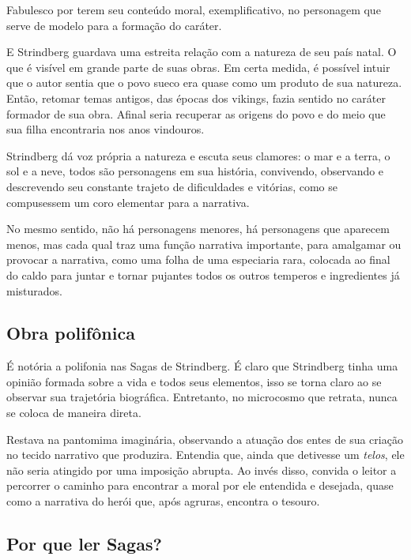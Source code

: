\documentclass[12pt]{extarticle}
\begin{document}
Fabulesco por terem seu conteúdo moral, exemplificativo, no personagem
que serve de modelo para a formação do caráter.

E Strindberg guardava uma estreita relação com a natureza de seu país
natal. O que é visível em grande parte de suas obras. Em certa medida, é
possível intuir que o autor sentia que o povo sueco era quase como um
produto de sua natureza. Então, retomar temas antigos, das épocas dos
vikings, fazia sentido no caráter formador de sua obra. Afinal seria
recuperar as origens do povo e do meio que sua filha encontraria nos
anos vindouros.




Strindberg dá voz própria a natureza e escuta seus clamores: o mar e a
terra, o sol e a neve, todos são personagens em sua história,
convivendo, observando e descrevendo seu constante trajeto de
dificuldades e vitórias, como se compusessem um coro elementar para a
narrativa.

No mesmo sentido, não há personagens menores, há personagens que
aparecem menos, mas cada qual traz uma função narrativa importante, para
amalgamar ou provocar a narrativa, como uma folha de uma especiaria
rara, colocada ao final do caldo para juntar e tornar pujantes todos os
outros temperos e ingredientes já misturados.

\subsection{Obra polifônica}

É notória a polifonia nas Sagas de Strindberg. É claro que Strindberg
tinha uma opinião formada sobre a vida e todos seus elementos, isso se
torna claro ao se observar sua trajetória biográfica. Entretanto, no
microcosmo que retrata, nunca se coloca de maneira direta.

Restava na pantomima imaginária, observando a atuação dos entes de sua
criação no tecido narrativo que produzira. Entendia que, ainda que
detivesse um \emph{telos}, ele não seria atingido por uma imposição
abrupta. Ao invés disso, convida o leitor a percorrer o caminho para
encontrar a moral por ele entendida e desejada, quase como a narrativa
do herói que, após agruras, encontra o tesouro.

\subsection{Por que ler Sagas?}
\end{document}
